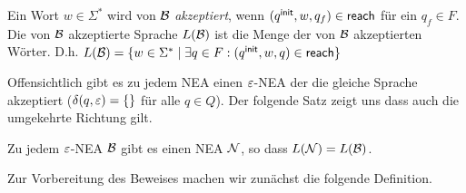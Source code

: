 \begin{Def}
 Ein Wort $w\in\Sigma^*$ wird von $\mathcal{B}$ \emph{akzeptiert}, wenn $({q^\mathsf{init}},w,q_f)\in\textsf{reach}$ für ein $q_f\in F$.
 Die von $\mathcal{B}$ akzeptierte Sprache $L(\mathcal{B})$ ist die Menge der von $\mathcal{B}$ akzeptierten Wörter. D.h.	
	$L(\mathcal{B})=\{ w\in\Sigma^* \mid \exists q\in F: ({q^\mathsf{init}}, w, q)\in\textsf{reach} \}$
\end{Def}

Offensichtlich gibt es zu jedem \ac{NEA} einen $\varepsilon$-NEA der die gleiche Sprache akzeptiert ($\delta(q,\varepsilon)=\{\}$ für alle $q\in Q$).
Der folgende Satz zeigt uns dass auch die umgekehrte Richtung gilt.

\begin{Satz}
    Zu jedem $\varepsilon$-NEA $\mathcal{B}$ gibt es einen \ac{NEA} $\mathcal{N}$, so dass $L(\mathcal{N})=L(\mathcal{B})$.
\end{Satz}
Zur Vorbereitung des Beweises machen wir zunächst die folgende Definition.

